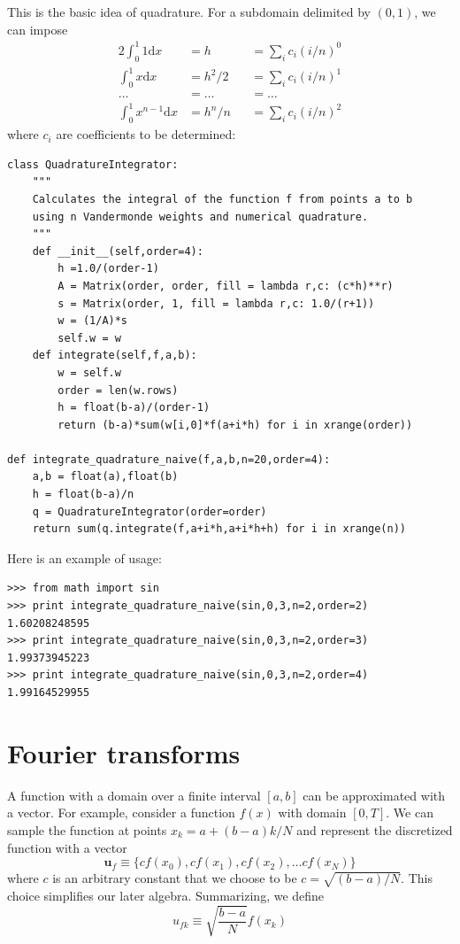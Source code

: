 \documentclass[justified,sixbynine]{tufte-book}
\def\ft{\small\tt}
\theoremstyle{plain}%
\theoremstyle{definition}
\theoremstyle{remark}
\begin{document}
\begin{fullwidth}
This is the basic idea of quadrature. For a subdomain delimited by $(0,1)$, we can impose
\begin{alignat}{2}
\int_0^1 1\textrm{d}x &= h &&= \sum_i c_i (i/n)^0 \\
\int_0^1 x\textrm{d}x &= h^2/2 &&= \sum_i c_i (i/n)^1 \\
\dots &= \dots &&= \dots \\
\int_0^1 x^{n-1}\textrm{d}x &= h^n/n &&= \sum_i c_i (i/n)^2
\end{alignat}
where $c_i$ are coefficients to be determined:


\begin{lstlisting}[caption={in file: {\ft nlib.py}}]
class QuadratureIntegrator:
    """
    Calculates the integral of the function f from points a to b
    using n Vandermonde weights and numerical quadrature.
    """
    def __init__(self,order=4):
        h =1.0/(order-1)
        A = Matrix(order, order, fill = lambda r,c: (c*h)**r)
        s = Matrix(order, 1, fill = lambda r,c: 1.0/(r+1))
        w = (1/A)*s
        self.w = w
    def integrate(self,f,a,b):
        w = self.w
        order = len(w.rows)
        h = float(b-a)/(order-1)
        return (b-a)*sum(w[i,0]*f(a+i*h) for i in xrange(order))

def integrate_quadrature_naive(f,a,b,n=20,order=4):
    a,b = float(a),float(b)
    h = float(b-a)/n
    q = QuadratureIntegrator(order=order)
    return sum(q.integrate(f,a+i*h,a+i*h+h) for i in xrange(n))
\end{lstlisting}

Here is an example of usage:

\begin{lstlisting}[caption={in file: {\ft nlib.py}}]
>>> from math import sin
>>> print integrate_quadrature_naive(sin,0,3,n=2,order=2)
1.60208248595
>>> print integrate_quadrature_naive(sin,0,3,n=2,order=3)
1.99373945223
>>> print integrate_quadrature_naive(sin,0,3,n=2,order=4)
1.99164529955
\end{lstlisting}

\newpage
\section{Fourier transforms}

A function with a domain over a finite interval $[a,b]$ can be approximated with a vector. For example, consider a function $f(x)$ with domain $[0,T]$. We can sample the function at points $x_k = a+(b-a)k/N$ and represent the discretized function with a vector
\begin{equation}
\mathbf{u}_f \equiv \{cf(x_0), cf(x_1), cf(x_2), \dots cf(x_N)\}
\end{equation}
where $c$ is an arbitrary constant that we choose to be $c=\sqrt{(b-a)/N}$. This choice simplifies our later algebra.
Summarizing, we define
\begin{equation}
u_{fk} \equiv \sqrt{\frac{b-a}{N}}f(x_k)
\end{equation}


\end{fullwidth}
\end{document}
